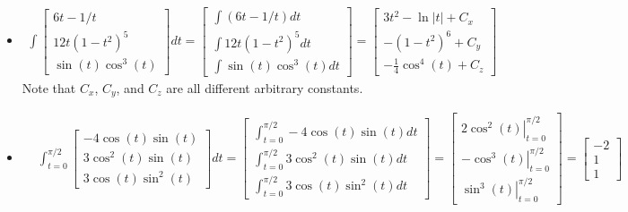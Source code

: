 \documentclass{article}
\begin{document}
\begin{itemize}
\item 
\begin{align*}
\int \begin{bmatrix}
6t - 1/t \\ 
12t(1 - t^2)^5 \\ 
\sin(t)\cos^3(t)
\end{bmatrix} dt 
= \begin{bmatrix}
\int (6t - 1/t)dt \\ 
\int 12t(1 - t^2)^5dt \\ 
\int \sin(t)\cos^3(t)dt 
\end{bmatrix}
= \begin{bmatrix}
3t^2 - \ln|t| + C_x \\ 
-(1 - t^2)^6 + C_y \\ 
-\frac{1}{4}\cos^4(t) + C_z
\end{bmatrix}
\end{align*}
Note that \(C_x\), \(C_y\), and \(C_z\) are all different arbitrary constants.
\item 
\begin{align*}
& \int_{t = 0}^{\pi/2} \begin{bmatrix} 
-4\cos(t)\sin(t) \\
3\cos^2(t)\sin(t) \\
3\cos(t)\sin^2(t) 
\end{bmatrix} dt 
= \begin{bmatrix} 
\int_{t = 0}^{\pi/2} -4\cos(t)\sin(t)dt \\
\int_{t = 0}^{\pi/2} 3\cos^2(t)\sin(t)dt \\
\int_{t = 0}^{\pi/2} 3\cos(t)\sin^2(t)dt 
\end{bmatrix}  
= \begin{bmatrix} 
\left. 2\cos^2(t) \right|_{t = 0}^{\pi/2} \\
\left. -\cos^3(t) \right|_{t = 0}^{\pi/2} \\
\left. \sin^3(t) \right|_{t = 0}^{\pi/2}
\end{bmatrix}  
= \begin{bmatrix} 
-2 \\
1 \\
1
\end{bmatrix}
\end{align*}
\end{itemize}

\vspace{5mm}
\end{document}
